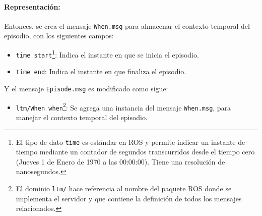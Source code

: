 \paragraph{Representación:}
Entonces, se crea el mensaje \texttt{When.msg} para almacenar el contexto temporal del episodio, con los siguientes campos:
\begin{itemize}
	\item \texttt{time start}\footnote{El tipo de dato \texttt{time} es estándar en ROS y permite indicar un instante de tiempo mediante un contador de segundos transcurridos desde el tiempo cero (Jueves 1 de Enero de 1970 a las 00:00:00). Tiene una resolución de nanosegundos.}: Indica el instante en que se inicia el episodio.
	\item \texttt{time end}: Indica el instante en que finaliza el episodio.
\end{itemize}

Y el mensaje \texttt{Episode.msg} es modificado como sigue:
\begin{itemize}
	\item \texttt{ltm/When when}\footnote{El dominio \texttt{ltm/} hace referencia al nombre del paquete ROS donde se implementa el servidor y que contiene la definición de todos los mensajes relacionados.}: Se agrega una instancia del mensaje \texttt{When.msg}, para manejar el contexto temporal del episodio.
\end{itemize}



